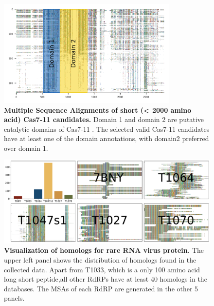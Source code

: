 \pagebreak
\clearpage
\begin{figpage}
  \captionsetup[figure]{width=0.8\textwidth}
  \begin{figure}
    \centering
    \includegraphics[width=0.8\textwidth]{images/cas711verysmall_valid_output.pdf}
    \caption{\textbf{Multiple Sequence Alignments of short (< 2000 amino acid) Cas7-11 candidates.} Domain 1 and domain 2 are putative catalytic domains of Cas7-11 \cite{ozcan_programmable_2021}. The selected valid Cas7-11 candidates have at least one of the domain annotations, with domain2 preferred over domain 1.}
    \label{fig:cas7-11-candidate-MSA}
  \end{figure}
  \begin{figure}[t]
    \centering
    \includegraphics[width=\textwidth]{images/rna_virus_hits_with_images.pdf}
    \caption{\textbf{Visualization of homologs for rare RNA virus protein.}
    The upper left panel shows the distribution of homologs found in the collected data. Apart from T1033, which is a only 100 amino acid long short peptide,all other RdRPs have at least 40 homologs in the databases. The MSAs of each RdRP are generated in the other 5 panels.}
    \label{fig:rna-virus-hits}
  \end{figure}
  \restoregeometry
\end{figpage}
\clearpage
\pagebreak
